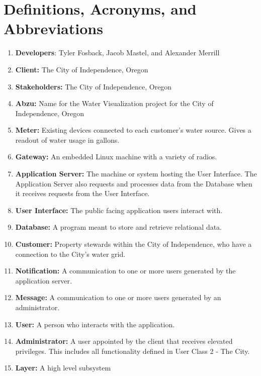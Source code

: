 \documentclass[journal]{IEEEtran}
\begin{document}


\section{Definitions, Acronyms, and Abbreviations}

\begin{enumerate}

\item \textbf{Developers}: Tyler Fosback, Jacob Mastel, and Alexander Merrill 
\item \textbf{Client:} The City of Independence, Oregon 
\item \textbf{Stakeholders:} The City of Independence, Oregon
\item \textbf{Abzu:} Name for the Water Visualization project for the City of Independence, Oregon 
\item \textbf{Meter:} Existing devices connected to each customer’s water source.  Gives a readout of water usage in gallons. 
\item \textbf{Gateway:} An embedded Linux machine with a variety of radios. 
\item \textbf{Application Server:} The machine or system hosting the User Interface. The Application Server also requests and processes data from the Database when it receives requests from the User Interface. 
\item \textbf{User Interface:} The public facing application users interact with. 
\item \textbf{Database:} A program meant to store and retrieve relational data. 
\item \textbf{Customer:} Property stewards within the City of Independence, who have a connection to the City's water grid. 
\item \textbf{Notification:} A communication to one or more users generated by the application server. 
\item \textbf{Message:} A communication to one or more users generated by an administrator. 
\item \textbf{User:} A person who interacts with the application. 
\item \textbf{Administrator:} A user appointed by the client that receives elevated privileges. This includes all functionality defined in User Class 2 - The City. 
\item \textbf{Layer:} A high level subsystem  

\end{enumerate}
\end{document}
